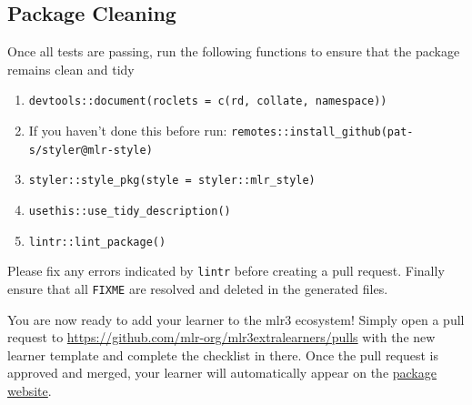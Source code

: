 \documentclass[
]{scrbook}
\newenvironment{Shaded}{\begin{snugshade}}{\end{snugshade}}
\newcommand{\AttributeTok}[1]{\textcolor[rgb]{0.77,0.63,0.00}{#1}}
\newcommand{\FunctionTok}[1]{\textcolor[rgb]{0.00,0.00,0.00}{#1}}
\newcommand{\NormalTok}[1]{#1}
\newcommand{\OtherTok}[1]{\textcolor[rgb]{0.56,0.35,0.01}{#1}}
\newcommand{\SpecialCharTok}[1]{\textcolor[rgb]{0.00,0.00,0.00}{#1}}
\newcommand{\StringTok}[1]{\textcolor[rgb]{0.31,0.60,0.02}{#1}}
\providecommand{\tightlist}{%
  \setlength{\itemsep}{0pt}\setlength{\parskip}{0pt}}
\renewenvironment{Shaded} {\begin{snugshade}\small} {\end{snugshade}}
\begin{document}
\begin{Shaded}
\end{Shaded}

\hypertarget{cleaning}{%
\subsection{Package Cleaning}\label{cleaning}}

Once all tests are passing, run the following functions to ensure that the package remains clean and tidy

\begin{enumerate}
\def\labelenumi{\arabic{enumi}.}
\tightlist
\item
  \texttt{devtools::document(roclets\ =\ c(\textquotesingle{}rd\textquotesingle{},\ \textquotesingle{}collate\textquotesingle{},\ \textquotesingle{}namespace\textquotesingle{}))}
\item
  If you haven't done this before run: \texttt{remotes::install\_github(\textquotesingle{}pat-s/styler@mlr-style\textquotesingle{})}
\item
  \texttt{styler::style\_pkg(style\ =\ styler::mlr\_style)}
\item
  \texttt{usethis::use\_tidy\_description()}
\item
  \texttt{lintr::lint\_package()}
\end{enumerate}

Please fix any errors indicated by \texttt{lintr} before creating a pull request. Finally ensure that all \texttt{FIXME} are resolved and deleted in the generated files.

You are now ready to add your learner to the mlr3 ecosystem! Simply open a pull request to \url{https://github.com/mlr-org/mlr3extralearners/pulls} with the new learner template and complete the checklist in there. Once the pull request is approved and merged, your learner will automatically appear on the \href{https://mlr3extralearners.mlr-org.com/}{package website}.
\end{document}
